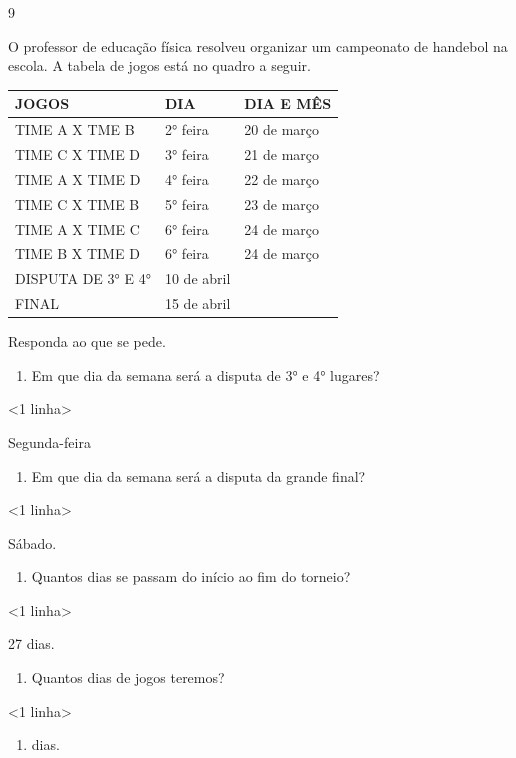 {{{{{\num{9}

O professor de educação física resolveu organizar um campeonato de
handebol na escola. A tabela de jogos está no quadro a seguir.

\begin{longtable}[]{@{}lll@{}}
\toprule
JOGOS & DIA & DIA E MÊS\tabularnewline
\midrule
\endhead
TIME A X TME B & 2° feira & 20 de março\tabularnewline
TIME C X TIME D & 3° feira & 21 de março\tabularnewline
TIME A X TIME D & 4° feira & 22 de março\tabularnewline
TIME C X TIME B & 5° feira & 23 de março\tabularnewline
TIME A X TIME C & 6° feira & 24 de março\tabularnewline
TIME B X TIME D & 6° feira & 24 de março\tabularnewline
DISPUTA DE 3° E 4° & 10 de abril\tabularnewline
FINAL & 15 de abril\tabularnewline
\bottomrule
\end{longtable}

Responda ao que se pede.

\begin{enumerate}
\def\labelenumi{\alph{enumi})}
\item
  Em que dia da semana será a disputa de 3° e 4° lugares?
\end{enumerate}

\textless{}1 linha\textgreater{}

Segunda-feira

\begin{enumerate}
\def\labelenumi{\alph{enumi})}
\item
  Em que dia da semana será a disputa da grande final?
\end{enumerate}

\textless{}1 linha\textgreater{}

Sábado.

\begin{enumerate}
\def\labelenumi{\alph{enumi})}
\item
  Quantos dias se passam do início ao fim do torneio?
\end{enumerate}

\textless{}1 linha\textgreater{}

27 dias.

\begin{enumerate}
\def\labelenumi{\alph{enumi})}
\item
  Quantos dias de jogos teremos?
\end{enumerate}

\textless{}1 linha\textgreater{}

\begin{enumerate}
\def\labelenumi{\arabic{enumi}.}
\setcounter{enumi}{7}
\item
  dias.
\end{enumerate}

}}}}}

